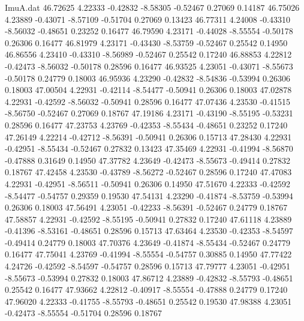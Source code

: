 \begin{filecontents}{ImuA.dat}
  46.72625    4.22333   -0.42832   -8.58305   -0.52467    0.27069    0.14187
  46.75026    4.23889   -0.43071   -8.57109   -0.51704    0.27069    0.13423
  46.77311    4.24008   -0.43310   -8.56032   -0.48651    0.23252    0.16477
  46.79590    4.23171   -0.44028   -8.55554   -0.50178    0.26306    0.16477
  46.81979    4.23171   -0.43430   -8.53759   -0.52467    0.25542    0.14950
  46.86556    4.23410   -0.43310   -8.56989   -0.52467    0.25542    0.17240
  46.88853    4.22812   -0.42473   -8.56032   -0.50178    0.28596    0.16477
  46.93525    4.23051   -0.43071   -8.55673   -0.50178    0.24779    0.18003
  46.95936    4.23290   -0.42832   -8.54836   -0.53994    0.26306    0.18003
  47.00504    4.22931   -0.42114   -8.54477   -0.50941    0.26306    0.18003
  47.02878    4.22931   -0.42592   -8.56032   -0.50941    0.28596    0.16477
  47.07436    4.23530   -0.41515   -8.56750   -0.52467    0.27069    0.18767
  47.19186    4.23171   -0.43190   -8.55195   -0.53231    0.28596    0.16477
  47.23753    4.23769   -0.42353   -8.55434   -0.48651    0.23252    0.17240
  47.26149    4.22214   -0.42712   -8.56391   -0.50941    0.26306    0.15713
  47.28430    4.22931   -0.42951   -8.55434   -0.52467    0.27832    0.13423
  47.35469    4.22931   -0.41994   -8.56870   -0.47888    0.31649    0.14950
  47.37782    4.23649   -0.42473   -8.55673   -0.49414    0.27832    0.18767
  47.42458    4.23530   -0.43789   -8.56272   -0.52467    0.28596    0.17240
  47.47083    4.22931   -0.42951   -8.56511   -0.50941    0.26306    0.14950
  47.51670    4.22333   -0.42592   -8.54477   -0.54757    0.29359    0.19530
  47.54131    4.23290   -0.41874   -8.53759   -0.53994    0.26306    0.18003
  47.56491    4.23051   -0.42233   -8.56391   -0.52467    0.24779    0.18767
  47.58857    4.22931   -0.42592   -8.55195   -0.50941    0.27832    0.17240
  47.61118    4.23889   -0.41396   -8.53161   -0.48651    0.28596    0.15713
  47.63464    4.23530   -0.42353   -8.54597   -0.49414    0.24779    0.18003
  47.70376    4.23649   -0.41874   -8.55434   -0.52467    0.24779    0.16477
  47.75041    4.23769   -0.41994   -8.55554   -0.54757    0.30885    0.14950
  47.77422    4.24726   -0.42592   -8.54597   -0.54757    0.28596    0.15713
  47.79777    4.23051   -0.42951   -8.55673   -0.53994    0.27832    0.18003
  47.86712    4.23889   -0.42832   -8.55793   -0.48651    0.25542    0.16477
  47.93662    4.22812   -0.40917   -8.55554   -0.47888    0.24779    0.17240
  47.96020    4.22333   -0.41755   -8.55793   -0.48651    0.25542    0.19530
  47.98388    4.23051   -0.42473   -8.55554   -0.51704    0.28596    0.18767

\end{filecontents}
